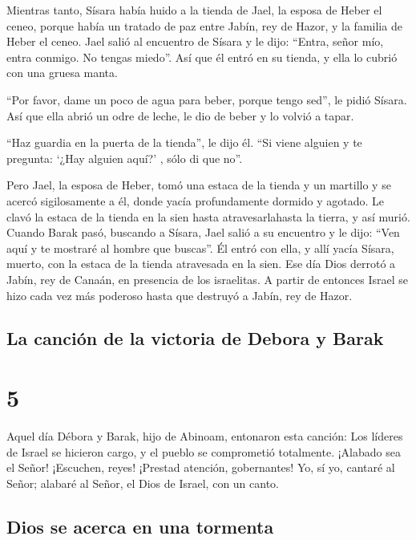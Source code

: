  Mientras tanto, Sísara había huido a la tienda de Jael,
la esposa de Heber el ceneo, porque había un tratado de paz entre Jabín,
rey de Hazor, y la familia de Heber el ceneo.  Jael salió
al encuentro de Sísara y le dijo: ``Entra, señor mío, entra conmigo. No
tengas miedo''. Así que él entró en su tienda, y ella lo cubrió con una
gruesa manta.

 ``Por favor, dame un poco de agua para beber, porque
tengo sed'', le pidió Sísara. Así que ella abrió un odre de leche, le
dio de beber y lo volvió a tapar.

 ``Haz guardia en la puerta de la tienda'', le dijo él.
``Si viene alguien y te pregunta: `¿Hay alguien aquí?' , sólo di que
no''.

 Pero Jael, la esposa de Heber, tomó una estaca de la
tienda y un martillo y se acercó sigilosamente a él, donde yacía
profundamente dormido y agotado. Le clavó la estaca de la tienda en la
sien hasta atravesarlahasta la tierra, y así murió. 
Cuando Barak pasó, buscando a Sísara, Jael salió a su encuentro y le
dijo: ``Ven aquí y te mostraré al hombre que buscas''. Él entró con
ella, y allí yacía Sísara, muerto, con la estaca de la tienda atravesada
en la sien.  Ese día Dios derrotó a Jabín, rey de Canaán,
en presencia de los israelitas.  A partir de entonces
Israel se hizo cada vez más poderoso hasta que destruyó a Jabín, rey de
Hazor.

\hypertarget{la-canciuxf3n-de-la-victoria-de-debora-y-barak}{%
\subsection{La canción de la victoria de Debora y
Barak}\label{la-canciuxf3n-de-la-victoria-de-debora-y-barak}}

\hypertarget{section-4}{%
\section{5}\label{section-4}}

 Aquel día Débora y Barak, hijo de Abinoam, entonaron esta
canción:  Los líderes de Israel se hicieron cargo, y el
pueblo se comprometió totalmente. ¡Alabado sea el Señor! 
¡Escuchen, reyes! ¡Prestad atención, gobernantes! Yo, sí yo, cantaré al
Señor; alabaré al Señor, el Dios de Israel, con un canto.

\hypertarget{dios-se-acerca-en-una-tormenta}{%
\subsection{Dios se acerca en una
tormenta}\label{dios-se-acerca-en-una-tormenta}}

